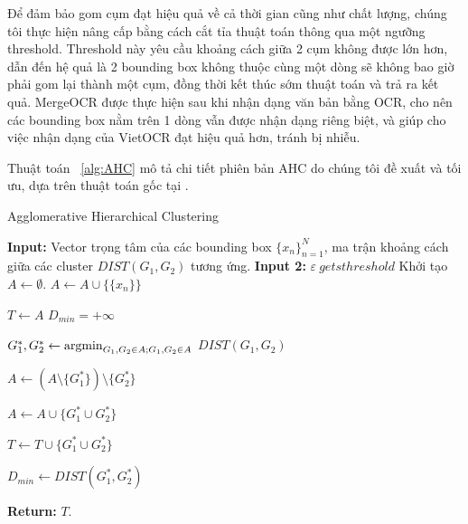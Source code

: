 Để đảm bảo gom cụm đạt hiệu quả về cả thời gian cũng như chất lượng, chúng tôi thực hiện nâng cấp bằng cách cắt tỉa thuật toán thông qua một ngưỡng threshold. Threshold này yêu cầu khoảng cách giữa 2 cụm không được lớn hơn, dẫn đến hệ quả là 2 bounding box không thuộc cùng một dòng sẽ không bao giờ phải gom lại thành một cụm, đồng thời kết thúc sớm thuật toán và trả ra kết quả. MergeOCR được thực hiện sau khi nhận dạng văn bản bằng OCR, cho nên các bounding box nằm trên 1 dòng vẫn được nhận dạng riêng biệt, và giúp cho việc nhận dạng của VietOCR đạt hiệu quả hơn, tránh bị nhiễu.

Thuật toán ~\ref{alg:AHC} mô tả chi tiết phiên bản AHC do chúng tôi đề xuất và tối ưu, dựa trên thuật toán gốc tại \cite{day1984efficient}.

\begin{algorithm}[H]
    \caption{Agglomerative Hierarchical Clustering} \label{alg:AHC}
    \begin{algorithmic}[1]
        \State \textbf{Input: } Vector trọng tâm của các bounding box $\{ x_n \}_{n=1}^{N}$, ma trận khoảng cách giữa các cluster $DIST(G_1, G_2)$ tương ứng.
        \State \textbf{Input 2: } $\varepsilon \ gets threshold$ 
        \State Khởi tạo $A \gets \emptyset$.
            \State $A \gets A \cup \{\{x_n\}\}$ 
        \EndFor
        
        \State $T \gets A$ 
        \State $D_{min} = +\infty$ 
        
         
                \State $G_1^{*}, G_2^{*} \gets \operatorname*{argmin}_{G_1, G_2 \in A; G_1, G_2 \in A}$ $DIST(G_1, G_2)$ 
                
                \State $A \gets (A \setminus \{ G_1^* \}) \setminus \{ G_2^* \}$ 
                
                \State $A \gets A \cup \{ G_1^* \cup G_2^* \}$ 
                
                \State $T \gets T \cup \{ G_1^* \cup G_2^* \}$ 
                
                \State $D_{min} \gets DIST(G_1^*, G_2^*)$ 
        \EndWhile
        
        \State \textbf{Return: } $T$. 
        
    \end{algorithmic}
\end{algorithm}

